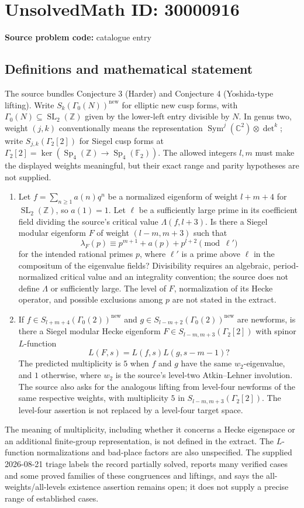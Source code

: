 \documentclass[11pt]{article}
\newcommand{\Z}{\mathbb{Z}}
\newcommand{\C}{\mathbb{C}}
\newcommand{\F}{\mathbb{F}}
\begin{document}
\section*{UnsolvedMath ID: 30000916}
\textbf{Source problem code:} catalogue entry
\subsection{Definitions and mathematical statement}
The source bundles Conjecture 3 (Harder) and Conjecture 4 (Yoshida-type lifting). Write $S_k(\Gamma_0(N))^{\mathrm{new}}$ for elliptic new cusp forms, with $\Gamma_0(N)\subseteq\operatorname{SL}_2(\Z)$ given by the lower-left entry divisible by $N$. In genus two, weight $(j,k)$ conventionally means the representation $\operatorname{Sym}^j(\C^2)\otimes\det^k$; write $S_{j,k}(\Gamma_2[2])$ for Siegel cusp forms at $\Gamma_2[2]=\ker(\operatorname{Sp}_4(\Z)\to\operatorname{Sp}_4(\F_2))$. The allowed integers $l,m$ must make the displayed weights meaningful, but their exact range and parity hypotheses are not supplied.\begin{enumerate}\item Let $f=\sum_{n\geq1}a(n)q^n$ be a normalized eigenform of weight $l+m+4$ for $\operatorname{SL}_2(\Z)$, so $a(1)=1$. Let $\ell$ be a sufficiently large prime in its coefficient field dividing the source's critical value $\Lambda(f,l+3)$. Is there a Siegel modular eigenform $F$ of weight $(l-m,m+3)$ such that \[\lambda_F(p)\equiv p^{m+1}+a(p)+p^{l+2}\pmod{\ell'}\] for the intended rational primes $p$, where $\ell'$ is a prime above $\ell$ in the compositum of the eigenvalue fields? Divisibility requires an algebraic, period-normalized critical value and an integrality convention; the source does not define $\Lambda$ or sufficiently large. The level of $F$, normalization of its Hecke operator, and possible exclusions among $p$ are not stated in the extract.\item If $f\in S_{l+m+4}(\Gamma_0(2))^{\mathrm{new}}$ and $g\in S_{l-m+2}(\Gamma_0(2))^{\mathrm{new}}$ are newforms, is there a Siegel modular Hecke eigenform $F\in S_{l-m,m+3}(\Gamma_2[2])$ with spinor $L$-function \[L(F,s)=L(f,s)L(g,s-m-1)?\] The predicted multiplicity is $5$ when $f$ and $g$ have the same $w_2$-eigenvalue, and $1$ otherwise, where $w_2$ is the source's level-two Atkin--Lehner involution. The source also asks for the analogous lifting from level-four newforms of the same respective weights, with multiplicity $5$ in $S_{l-m,m+3}(\Gamma_2[2])$. The level-four assertion is not replaced by a level-four target space.\end{enumerate} The meaning of multiplicity, including whether it concerns a Hecke eigenspace or an additional finite-group representation, is not defined in the extract. The $L$-function normalizations and bad-place factors are also unspecified. The supplied 2026-08-21 triage labels the record partially solved, reports many verified cases and some proved families of these congruences and liftings, and says the all-weights/all-levels existence assertion remains open; it does not supply a precise range of established cases.
\end{document}
